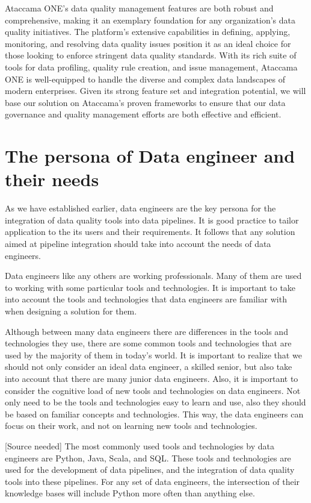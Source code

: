 Ataccama ONE's data quality management features are both robust and comprehensive, making it an exemplary foundation for any organization's data quality initiatives. The platform's extensive capabilities in defining, applying, monitoring, and resolving data quality issues position it as an ideal choice for those looking to enforce stringent data quality standards. With its rich suite of tools for data profiling, quality rule creation, and issue management, Ataccama ONE is well-equipped to handle the diverse and complex data landscapes of modern enterprises. Given its strong feature set and integration potential, we will base our solution on Ataccama's proven frameworks to ensure that our data governance and quality management efforts are both effective and efficient.

\section{The persona of Data engineer and their needs}

As we have established earlier, data engineers are the key persona for the integration of data quality tools into data pipelines. It is good practice to tailor application to the its users and their requirements. It follows that any solution aimed at pipeline integration should take into account the needs of data engineers.

Data engineers like any others are working professionals. Many of them are used to working with some particular tools and technologies. It is important to take into account the tools and technologies that data engineers are familiar with when designing a solution for them.

Although between many data engineers there are differences in the tools and technologies they use, there are some common tools and technologies that are used by the majority of them in today's world. It is important to realize that we should not only consider an ideal data engineer, a skilled senior, but also take into account that there are many junior data engineers. Also, it is important to consider the cognitive load of new tools and technologies on data engineers. Not only need to be the tools and technologies easy to learn and use, also they should be based on familiar concepts and technologies. This way, the data engineers can focus on their work, and not on learning new tools and technologies. 

[Source needed] The most commonly used tools and technologies by data engineers are Python, Java, Scala, and SQL. These tools and technologies are used for the development of data pipelines, and the integration of data quality tools into these pipelines. For any set of data engineers, the intersection of their knowledge bases will include Python more often than anything else.

